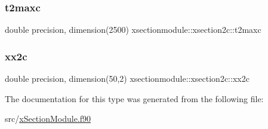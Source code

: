 \mbox{\label{structxsectionmodule_1_1xsection2c_a018273d6282bd59362ba70923de20c15}} 
\subsubsection{\texorpdfstring{t2maxc}{t2maxc}}
{\footnotesize\ttfamily double precision, dimension(2500) xsectionmodule\+::xsection2c\+::t2maxc}

\mbox{\label{structxsectionmodule_1_1xsection2c_aeaa704ffd910c6478c4a3a0f38d76231}} 
\subsubsection{\texorpdfstring{xx2c}{xx2c}}
{\footnotesize\ttfamily double precision, dimension(50,2) xsectionmodule\+::xsection2c\+::xx2c}



The documentation for this type was generated from the following file\+:\begin{DoxyCompactItemize}
\item 
src/\hyperlink{x_section_module_8f90}{x\+Section\+Module.\+f90}\end{DoxyCompactItemize}
